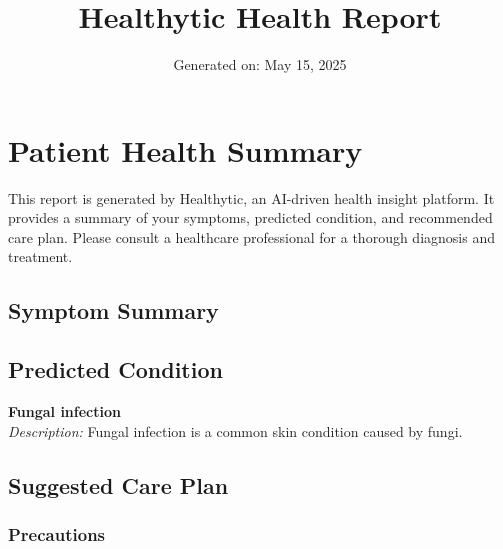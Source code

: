 \documentclass[a4paper,12pt]{article}
\title{\textbf{Healthytic Health Report}}
\author{}
\date{Generated on: May 15, 2025}
\begin{document}
\maketitle



\section*{Patient Health Summary}

This report is generated by Healthytic, an AI-driven health insight platform. It provides a summary of your symptoms, predicted condition, and recommended care plan. Please consult a healthcare professional for a thorough diagnosis and treatment.



\subsection*{Symptom Summary}

\begin{itemize}[leftmargin=*]



\end{itemize}



\subsection*{Predicted Condition}

\textbf{Fungal infection} \\

\textit{Description:} Fungal infection is a common skin condition caused by fungi.



\subsection*{Suggested Care Plan}

\subsubsection*{Precautions}

\begin{itemize}[leftmargin=*]



\end{itemize}
\end{document}
